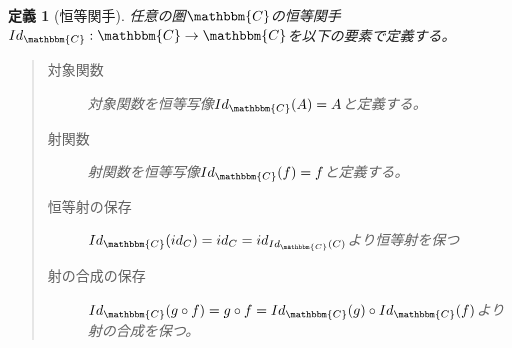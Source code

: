 \documentclass[uplatex,dvipdfmx]{jsarticle}
\newcommand{\cat}[1]{\mathbbm{#1}}
\newcommand{\arrow}{\rightarrow}
\newcommand{\functor}[3]{#1:\cat{#2}\arrow \cat{#3}}
\newtheorem{define}{定義}[section]
\numberwithin{proof}{subsection}
\numberwithin{prop}{subsection}
\numberwithin{define}{subsection}
\begin{document}
	\begin{define}[恒等関手]
		任意の圏$\cat{C}$の恒等関手$\functor{Id_{\cat{C}}}{C}{C}$を以下の要素で定義する。
		\begin{quote}
			\begin{description}
				\item[対象関数] 対象関数を恒等写像$Id_{\cat{C}}(A)=A$と定義する。
				\item[射関数] 射関数を恒等写像$Id_{\cat{C}}(f)=f$と定義する。
				\item[恒等射の保存] $Id_{\cat{C}}(id_C)=id_C=id_{Id_{\cat{C}}(C)}$より恒等射を保つ
				\item[射の合成の保存] $Id_{\cat{C}}(g\circ f)=g\circ f=Id_{\cat{C}}(g)\circ Id_{\cat{C}}(f)$より射の合成を保つ。
			\end{description}
		\end{quote}
	\end{define}
\end{document}
